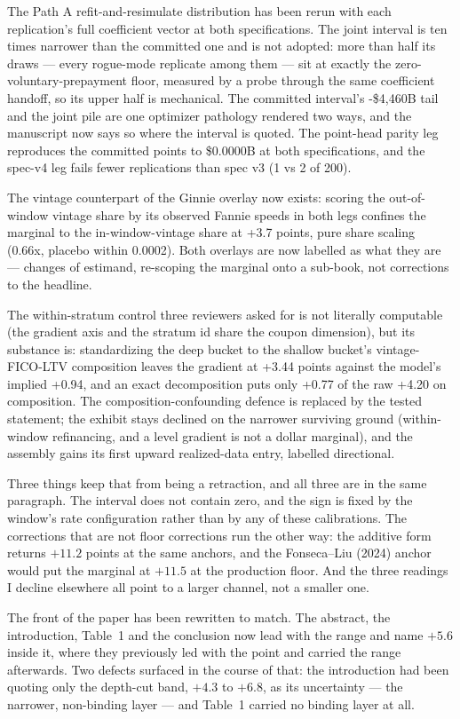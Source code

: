 \documentclass[11pt]{article}
\begin{document}
The Path A refit-and-resimulate distribution has been rerun with each
replication's full coefficient vector at both specifications. The joint interval
is ten times narrower than the committed one and is not adopted: more than half
its draws --- every rogue-mode replicate among them --- sit at exactly the
zero-voluntary-prepayment floor, measured by a probe through the same
coefficient handoff, so its upper half is mechanical. The committed interval's
-\$4,460B tail and the joint pile are one optimizer pathology rendered two ways,
and the manuscript now says so where the interval is quoted. The point-head
parity leg reproduces the committed points to \$0.0000B at both specifications,
and the spec-v4 leg fails fewer replications than spec v3 (1 vs 2 of 200).

The vintage counterpart of the Ginnie overlay now exists: scoring the
out-of-window vintage share by its observed Fannie speeds in both legs confines
the marginal to the in-window-vintage share at +3.7 points, pure share scaling
(0.66x, placebo within 0.0002). Both overlays are now labelled as what they
are --- changes of estimand, re-scoping the marginal onto a sub-book, not
corrections to the headline.

The within-stratum control three reviewers asked for is not literally
computable (the gradient axis and the stratum id share the coupon dimension),
but its substance is: standardizing the deep bucket to the shallow bucket's
vintage-FICO-LTV composition leaves the gradient at +3.44 points against the
model's implied +0.94, and an exact decomposition puts only +0.77 of the raw
+4.20 on composition. The composition-confounding defence is replaced by the
tested statement; the exhibit stays declined on the narrower surviving ground
(within-window refinancing, and a level gradient is not a dollar marginal),
and the assembly gains its first upward realized-data entry, labelled
directional.

Three things keep that from being a retraction, and all three are in the same
paragraph. The interval does not contain zero, and the sign is fixed by the window's
rate configuration rather than by any of these calibrations. The corrections that are
not floor corrections run the other way: the additive form returns $+11.2$ points at
the same anchors, and the Fonseca--Liu (2024) anchor would put the marginal at $+11.5$
at the production floor. And the three readings I decline elsewhere all point to a
larger channel, not a smaller one.

The front of the paper has been rewritten to match. The abstract, the introduction,
Table~1 and the conclusion now lead with the range and name $+5.6$ inside it, where
they previously led with the point and carried the range afterwards. Two defects
surfaced in the course of that: the introduction had been quoting only the depth-cut
band, $+4.3$ to $+6.8$, as its uncertainty --- the narrower, non-binding layer --- and
Table~1 carried no binding layer at all.
\end{document}

